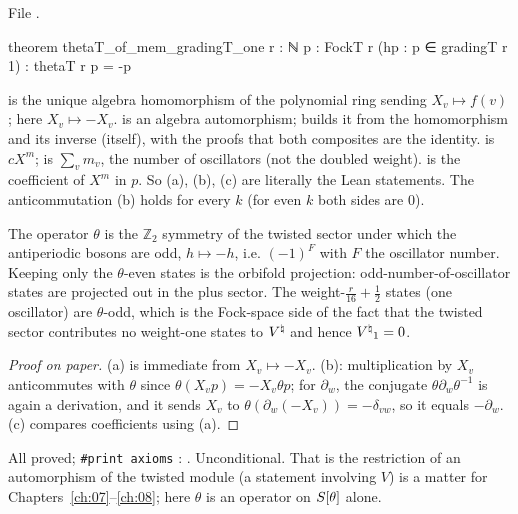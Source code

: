 \noindent File .
\begin{leancode}
theorem thetaT_of_mem_gradingT_one {r : ℕ} {p : FockT r} (hp : p ∈ gradingT r 1) :
    thetaT r p = -p
\end{leancode}
\begin{dictionary}
 is the unique algebra homomorphism of the polynomial ring sending $X_v\mapsto f(v)$;
here $X_v\mapsto -X_v$.   is an algebra automorphism;  builds it
from the homomorphism and its inverse (itself), with the proofs that both composites are the
identity.   is $cX^m$;  is $\sum_v m_v$, the number of
oscillators (not the doubled weight).   is the coefficient of $X^m$ in $p$.  So (a),
(b), (c) are literally the Lean statements.  The anticommutation (b) holds for every $k$ (for even
$k$ both sides are $0$).
\end{dictionary}

\begin{physics}
The operator $\theta$ is the $\mathbb Z_2$ symmetry of the twisted sector under which the antiperiodic bosons are odd, $h\mapsto-h$, i.e. $(-1)^{F}$ with $F$ the oscillator number. Keeping only the $\theta$-even states is the orbifold projection: odd-number-of-oscillator states are projected out in the plus sector. The weight-$\tfrac{r}{16}+\tfrac12$ states (one oscillator) are $\theta$-odd, which is the Fock-space side of the fact that the twisted sector contributes no weight-one states to ${V^{\natural}}$ and hence ${V^{\natural}}_1=0$.
\end{physics}
\begin{proof}[Proof on paper]
(a) is immediate from $X_v\mapsto-X_v$.  (b): multiplication by $X_v$ anticommutes with $\theta$
since $\theta(X_vp)=-X_v\theta p$; for $\partial_w$, the conjugate $\theta\partial_w\theta^{-1}$ is again a derivation,
and it sends $X_v$ to $\theta(\partial_w(-X_v))=-\delta_{vw}$, so it equals $-\partial_w$.  (c) compares
coefficients using (a).
\end{proof}
\begin{status}
All proved; \texttt{\#print axioms} : .  Unconditional.  That  is the restriction of an
automorphism of the twisted module (a statement involving $V$) is a matter for
Chapters~\ref{ch:07}--\ref{ch:08}; here $\theta$ is an operator on $S[\theta]$ alone.
\end{status}


